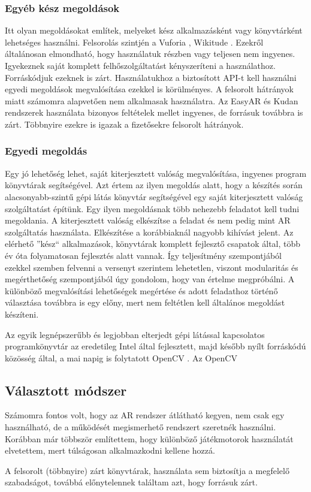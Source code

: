 \documentclass[12pt,a4paper,oneside]{report} %
\begin{document}
\subsubsection{Egyéb kész megoldások}
Itt olyan megoldásokat említek, melyeket kész alkalmazásként vagy könyvtárként lehetséges használni. Felsorolás szintjén a Vuforia \cite{vuforia}, Wikitude \cite{wikitude}.
Ezekről általánosan elmondható, hogy használatuk részben vagy teljesen nem ingyenes. Igyekeznek saját komplett felhőszolgáltatást kényszeríteni a használathoz. Forráskódjuk ezeknek is zárt. Használatukhoz a biztosított API-t kell használni egyedi megoldások megvalósítása ezekkel is körülményes.  A felsorolt hátrányok miatt számomra alapvetően nem alkalmasak használatra.
Az EasyAR \cite{ezar} és Kudan \cite{kudan} rendszerek használata bizonyos feltételek mellet ingyenes, de forrásuk továbbra is zárt. Többnyire ezekre is igazak a  fizetősekre felsorolt hátrányok.

\subsubsection{Egyedi megoldás}
Egy jó lehetőség lehet, saját kiterjesztett valóság megvalósítása, ingyenes program könyvtárak segítségével.
Azt értem az ilyen megoldás alatt, hogy a készítés során alacsonyabb-szintű gépi látás könyvtár segítségével egy saját kiterjesztett valóság szolgáltatást építünk. Egy ilyen megoldásnak több nehezebb feladatot kell tudni megoldania. A kiterjesztett valóság elkészítse a feladat és nem pedig mint AR szolgáltatás használata. Elkészítése a korábbiaknál nagyobb kihívást jelent. Az elérhető ''kész`` alkalmazások, könyvtárak komplett fejlesztő csapatok által, több év óta folyamatosan fejlesztés alatt vannak. Így teljesítmény szempontjából ezekkel szemben felvenni a versenyt szerintem lehetetlen, viszont modularitás és megérthetőség szempontjából úgy gondolom, hogy van értelme megpróbálni. A különböző megvalósítási lehetőségek megértése és adott feladathoz történő választása továbbra is egy előny, mert nem feltétlen kell általános megoldást készíteni.

\par Az egyik legnépszerűbb és  legjobban elterjedt gépi látással kapcsolatos programkönyvtár az eredetileg Intel által fejlesztett,  majd később nyílt forráskódú közösség által, a mai napig is folytatott OpenCV \cite{opencv_library}. Az OpenCV \cite{pulli2012real} \cite{opencv}
\subsection{Választott módszer}
Számomra fontos volt, hogy az AR rendszer átlátható kegyen, nem csak egy használható, de a működését megismerhető rendszert szeretnék használni. Korábban már többször említettem, hogy különböző játékmotorok használatát elvetettem, mert túlságosan alkalmazkodni kellene hozzá. 
\par A felsorolt (többnyire) zárt könyvtárak, használata sem biztosítja a megfelelő szabadságot, továbbá előnytelennek találtam azt, hogy forrásuk zárt.
\end{document}
